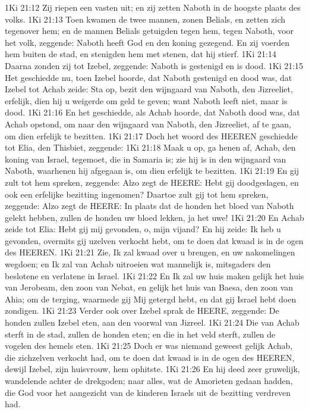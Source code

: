 1Ki 21:12  Zij riepen een vasten uit; en zij zetten Naboth in de hoogste plaats des volks.
1Ki 21:13  Toen kwamen de twee mannen, zonen Belials, en zetten zich tegenover hem; en de mannen Belials getuigden tegen hem, tegen Naboth, voor het volk, zeggende: Naboth heeft God en den koning gezegend. En zij voerden hem buiten de stad, en stenigden hem met stenen, dat hij stierf.
1Ki 21:14  Daarna zonden zij tot Izebel, zeggende: Naboth is gestenigd en is dood.
1Ki 21:15  Het geschiedde nu, toen Izebel hoorde, dat Naboth gestenigd en dood was, dat Izebel tot Achab zeide: Sta op, bezit den wijngaard van Naboth, den Jizreeliet, erfelijk, dien hij u weigerde om geld te geven; want Naboth leeft niet, maar is dood.
1Ki 21:16  En het geschiedde, als Achab hoorde, dat Naboth dood was, dat Achab opstond, om naar den wijngaard van Naboth, den Jizreeliet, af te gaan, om dien erfelijk te bezitten.
1Ki 21:17  Doch het woord des HEEREN geschiedde tot Elia, den Thisbiet, zeggende:
1Ki 21:18  Maak u op, ga henen af, Achab, den koning van Israel, tegemoet, die in Samaria is; zie hij is in den wijngaard van Naboth, waarhenen hij afgegaan is, om dien erfelijk te bezitten.
1Ki 21:19  En gij zult tot hem spreken, zeggende: Alzo zegt de HEERE: Hebt gij doodgeslagen, en ook een erfelijke bezitting ingenomen? Daartoe zult gij tot hem spreken, zeggende: Alzo zegt de HEERE: In plaats dat de honden het bloed van Naboth gelekt hebben, zullen de honden uw bloed lekken, ja het uwe!
1Ki 21:20  En Achab zeide tot Elia: Hebt gij mij gevonden, o, mijn vijand? En hij zeide: Ik heb u gevonden, overmits gij uzelven verkocht hebt, om te doen dat kwaad is in de ogen des HEEREN.
1Ki 21:21  Zie, Ik zal kwaad over u brengen, en uw nakomelingen wegdoen; en Ik zal van Achab uitroeien wat mannelijk is, mitsgaders den beslotene en verlatene in Israel.
1Ki 21:22  En Ik zal uw huis maken gelijk het huis van Jerobeam, den zoon van Nebat, en gelijk het huis van Baesa, den zoon van Ahia; om de terging, waarmede gij Mij getergd hebt, en dat gij Israel hebt doen zondigen.
1Ki 21:23  Verder ook over Izebel sprak de HEERE, zeggende: De honden zullen Izebel eten, aan den voorwal van Jizreel.
1Ki 21:24  Die van Achab sterft in de stad, zullen de honden eten; en die in het veld sterft, zullen de vogelen des hemels eten.
1Ki 21:25  Doch er was niemand geweest gelijk Achab, die zichzelven verkocht had, om te doen dat kwaad is in de ogen des HEEREN, dewijl Izebel, zijn huisvrouw, hem ophitste.
1Ki 21:26  En hij deed zeer gruwelijk, wandelende achter de drekgoden; naar alles, wat de Amorieten gedaan hadden, die God voor het aangezicht van de kinderen Israels uit de bezitting verdreven had.
